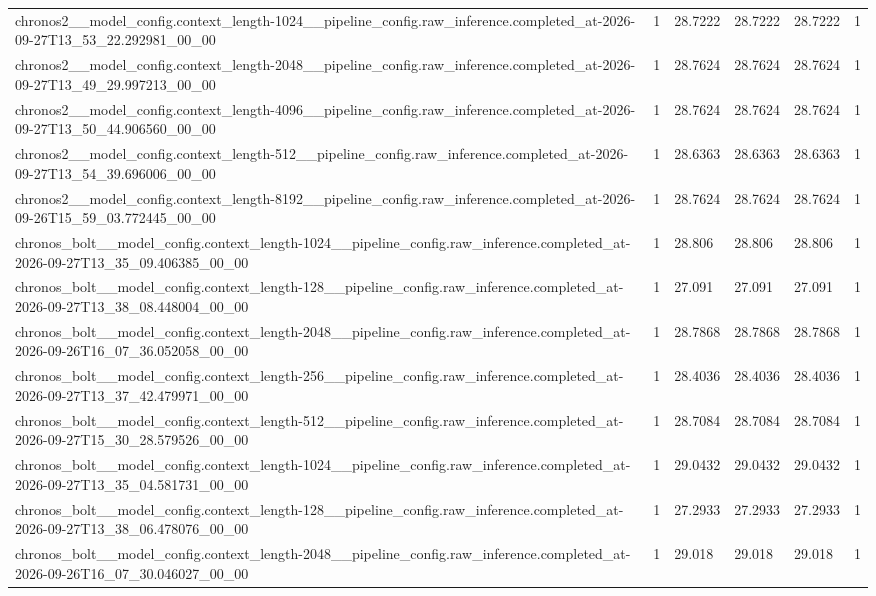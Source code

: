 \begin{tabular}{llllll}
chronos2\_\_model\_config.context\_length-1024\_\_pipeline\_config.raw\_inference.completed\_at-2026-09-27T13\_53\_22.292981\_00\_00 & 1 & 28.7222 & 28.7222 & 28.7222 & 1 \\
chronos2\_\_model\_config.context\_length-2048\_\_pipeline\_config.raw\_inference.completed\_at-2026-09-27T13\_49\_29.997213\_00\_00 & 1 & 28.7624 & 28.7624 & 28.7624 & 1 \\
chronos2\_\_model\_config.context\_length-4096\_\_pipeline\_config.raw\_inference.completed\_at-2026-09-27T13\_50\_44.906560\_00\_00 & 1 & 28.7624 & 28.7624 & 28.7624 & 1 \\
chronos2\_\_model\_config.context\_length-512\_\_pipeline\_config.raw\_inference.completed\_at-2026-09-27T13\_54\_39.696006\_00\_00 & 1 & 28.6363 & 28.6363 & 28.6363 & 1 \\
chronos2\_\_model\_config.context\_length-8192\_\_pipeline\_config.raw\_inference.completed\_at-2026-09-26T15\_59\_03.772445\_00\_00 & 1 & 28.7624 & 28.7624 & 28.7624 & 1 \\
chronos\_bolt\_\_model\_config.context\_length-1024\_\_pipeline\_config.raw\_inference.completed\_at-2026-09-27T13\_35\_09.406385\_00\_00 & 1 & 28.806 & 28.806 & 28.806 & 1 \\
chronos\_bolt\_\_model\_config.context\_length-128\_\_pipeline\_config.raw\_inference.completed\_at-2026-09-27T13\_38\_08.448004\_00\_00 & 1 & 27.091 & 27.091 & 27.091 & 1 \\
chronos\_bolt\_\_model\_config.context\_length-2048\_\_pipeline\_config.raw\_inference.completed\_at-2026-09-26T16\_07\_36.052058\_00\_00 & 1 & 28.7868 & 28.7868 & 28.7868 & 1 \\
chronos\_bolt\_\_model\_config.context\_length-256\_\_pipeline\_config.raw\_inference.completed\_at-2026-09-27T13\_37\_42.479971\_00\_00 & 1 & 28.4036 & 28.4036 & 28.4036 & 1 \\
chronos\_bolt\_\_model\_config.context\_length-512\_\_pipeline\_config.raw\_inference.completed\_at-2026-09-27T15\_30\_28.579526\_00\_00 & 1 & 28.7084 & 28.7084 & 28.7084 & 1 \\
chronos\_bolt\_\_model\_config.context\_length-1024\_\_pipeline\_config.raw\_inference.completed\_at-2026-09-27T13\_35\_04.581731\_00\_00 & 1 & 29.0432 & 29.0432 & 29.0432 & 1 \\
chronos\_bolt\_\_model\_config.context\_length-128\_\_pipeline\_config.raw\_inference.completed\_at-2026-09-27T13\_38\_06.478076\_00\_00 & 1 & 27.2933 & 27.2933 & 27.2933 & 1 \\
chronos\_bolt\_\_model\_config.context\_length-2048\_\_pipeline\_config.raw\_inference.completed\_at-2026-09-26T16\_07\_30.046027\_00\_00 & 1 & 29.018 & 29.018 & 29.018 & 1 \\

\end{tabular}

